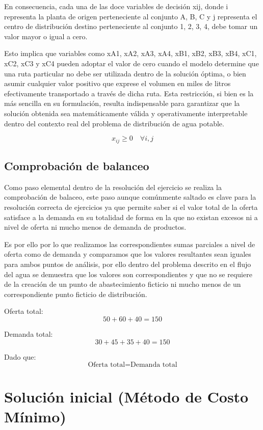 \documentclass{article}
\begin{document}
	En consecuencia, cada una de las doce variables de decisión xij, donde i representa la planta de origen perteneciente al conjunto {A, B, C} y j representa el centro de distribución destino perteneciente al conjunto {1, 2, 3, 4}, debe tomar un valor mayor o igual a cero.
	
	Esto implica que variables como xA1, xA2, xA3, xA4, xB1, xB2, xB3, xB4, xC1, xC2, xC3 y xC4 pueden adoptar el valor de cero cuando el modelo determine que una ruta particular no debe ser utilizada dentro de la solución óptima, o bien asumir cualquier valor positivo que exprese el volumen en miles de litros efectivamente transportado a través de dicha ruta. Esta restricción, si bien es la más sencilla en su formulación, resulta indispensable para garantizar que la solución obtenida sea matemáticamente válida y operativamente interpretable dentro del contexto real del problema de distribución de agua potable.
	
	\[
	x_{ij} \geq 0 \quad \forall i,j
	\]
	
	\subsection{Comprobación de balanceo}
	Como paso elemental dentro de la resolución del ejercicio se realiza la comprobación de balaceo, este paso aunque comúnmente saltado es clave para la resolución correcta de ejercicios ya que permite saber si el valor total de la oferta satisface a la demanda en su totalidad de forma en la que no existan excesos ni a nivel de oferta ni mucho menos de demanda de productos.
	
	Es por ello por lo que realizamos las correspondientes sumas parciales a nivel de oferta como de demanda y comparamos que los valores resultantes sean iguales para ambos puntos de análisis, por ello dentro del problema descrito en el flujo del agua se demuestra que los valores son correspondientes y que no se requiere de la creación de un punto de abastecimiento ficticio ni mucho menos de un correspondiente punto ficticio de distribución. 
	
	
	Oferta total:
	\[
	50 + 60 + 40 = 150
	\]
	
	Demanda total:
	\[
	30 + 45 + 35 + 40 = 150
	\]
	
	Dado que:
	\[
	\text{Oferta total} = \text{Demanda total}
	\]
	
	\section{Solución inicial (Método de Costo Mínimo)}
	
\end{document}
